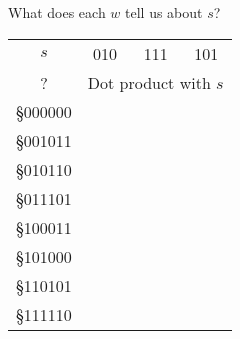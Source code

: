 {\begin{frame}{What does each $w$ tell us about $s$?}
\begin{center}
    \begin{tabular}{cccc}
    $s$ & 010 & 111 & 101 \\
    ? & \multicolumn{3}{c}{Dot product with $s$} \\
         \S{000}{0}{0}{0} \\
         \S{001}{0}{1}{1} \\
         \S{010}{1}{1}{0} \\
         \S{011}{1}{0}{1} \\
         \S{100}{0}{1}{1} \\
         \S{101}{0}{0}{0} \\
         \S{110}{1}{0}{1} \\
         \S{111}{1}{1}{0}
    \end{tabular}
\end{center}
    
\end{frame}
}